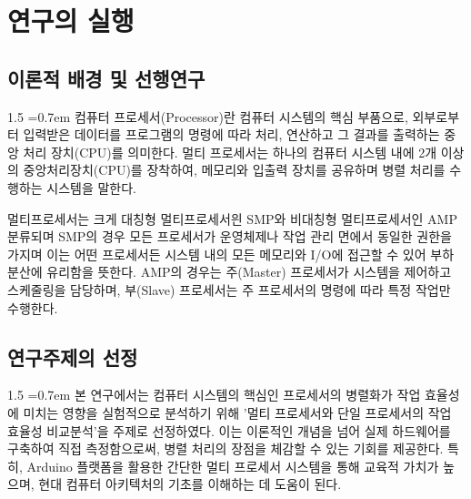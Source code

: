 \documentclass[a4paper, 12pt]{article}
\begin{document}
\section{연구의 실행}
\subsection{이론적 배경 및 선행연구}
\begin{spacing}{1.5}
\font=0.7em
컴퓨터 프로세서(Processor)란 컴퓨터 시스템의 핵심 부품으로, 외부로부터 입력받은 데이터를 프로그램의 명령에 따라 처리, 연산하고 그 결과를 출력하는 중앙 처리 장치(CPU)를 의미한다. 멀티 프로세서는 하나의 컴퓨터 시스템 내에 2개 이상의 중앙처리장치(CPU)를 장착하여, 메모리와 입출력 장치를 공유하며 병렬 처리를 수행하는 시스템을 말한다. 

멀티프로세서는 크게 대칭형 멀티프로세서읜 SMP와 비대칭형 멀티프로세서인 AMP 분류되며 SMP의 경우 모든 프로세서가 운영체제나 작업 관리 면에서 동일한 권한을 가지며 이는 어떤 프로세서든 시스템 내의 모든 메모리와 I/O에 접근할 수 있어 부하 분산에 유리함을 뜻한다. AMP의 경우는 주(Master) 프로세서가 시스템을 제어하고 스케줄링을 담당하며, 부(Slave) 프로세서는 주 프로세서의 명령에 따라 특정 작업만 수행한다.
\end{spacing}

\subsection{연구주제의 선정}
\begin{spacing}{1.5}
\font=0.7em
본 연구에서는 컴퓨터 시스템의 핵심인 프로세서의 병렬화가 작업 효율성에 미치는 영향을 실험적으로 분석하기 위해 '멀티 프로세서와 단일 프로세서의 작업 효율성 비교분석'을 주제로 선정하였다. 이는 이론적인 개념을 넘어 실제 하드웨어를 구축하여 직접 측정함으로써, 병렬 처리의 장점을 체감할 수 있는 기회를 제공한다. 특히, Arduino 플랫폼을 활용한 간단한 멀티 프로세서 시스템을 통해 교육적 가치가 높으며, 현대 컴퓨터 아키텍처의 기초를 이해하는 데 도움이 된다.
\end{spacing}
\end{document}

